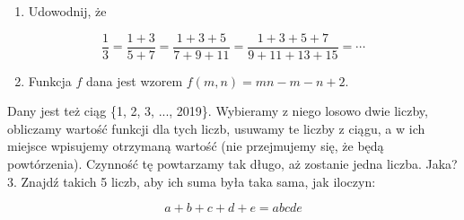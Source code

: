 \documentclass[10pt]{article}
\begin{document}
\begin{enumerate}
  \item Udowodnij, że
\end{enumerate}

\[
\frac{1}{3}=\frac{1+3}{5+7}=\frac{1+3+5}{7+9+11}=\frac{1+3+5+7}{9+11+13+15}=\cdots
\]

\begin{enumerate}
  \setcounter{enumi}{1}
  \item Funkcja \(f\) dana jest wzorem \(f(m, n)=m n-m-n+2\).
\end{enumerate}

Dany jest też ciąg \{1, 2, 3, ..., 2019\}. Wybieramy z niego losowo dwie liczby, obliczamy wartość funkcji dla tych liczb, usuwamy te liczby z ciągu, a w ich miejsce wpisujemy otrzymaną wartość (nie przejmujemy się, że będą powtórzenia). Czynność tę powtarzamy tak długo, aż zostanie jedna liczba. Jaka?\\
3. Znajdź takich 5 liczb, aby ich suma była taka sama, jak iloczyn:

\[
a+b+c+d+e=a b c d e
\]
\end{document}
